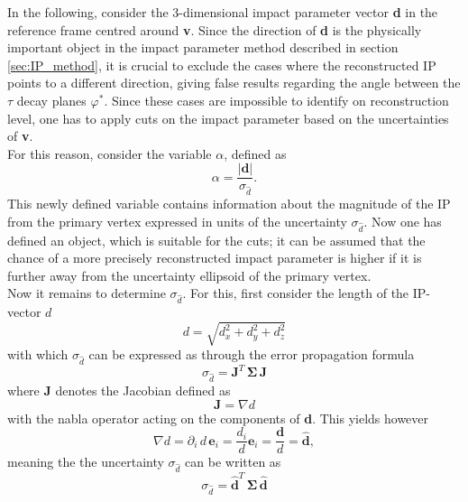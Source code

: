 In the following, consider the 3-dimensional impact parameter vector \textbf{d} in the reference frame centred around \textbf{v}. Since the direction of \textbf{d} is the physically important object in the impact parameter method described in section \ref{sec:IP_method}, it is crucial to exclude the cases where the reconstructed IP points to a different direction, giving false results regarding the angle between the $\tau$ decay planes $\varphi^*$. Since these cases are impossible to identify on reconstruction level, one has to apply cuts on the impact parameter based on the uncertainties of \textbf{v}.\\
For this reason, consider the variable $\alpha$, defined as
\begin{equation}
	\alpha = \frac{|\boldsymbol{d}|}{\sigma_{\hat{d}}}.
\end{equation}
This newly defined variable contains information about the magnitude of the IP from the primary vertex expressed in units of the uncertainty $\sigma_{\hat{d}}$. Now one has defined an object, which is suitable for the cuts; it can be assumed that the chance of a more precisely reconstructed impact parameter is higher if it is further away from the uncertainty ellipsoid of the primary vertex.\\
Now it remains to determine $\sigma_{\hat{d}}$. For this, first consider the length of the IP-vector $d$
\begin{equation}
	d = \sqrt{d_x^2+d_y^2+d_z^2}
\end{equation}
with which $\sigma_{\hat{d}}$ can be expressed as through the error propagation formula
\begin{equation}
	\sigma_{\hat{d}} = \mathbf{J}^T \, \boldsymbol{\Sigma} \, \mathbf{J}
\end{equation}
where \textbf{J} denotes the Jacobian defined as
\begin{equation}
	\mathbf{J} = \nabla d
\end{equation}
with the nabla operator acting on the components of \textbf{d}. This yields however
\begin{equation}
	\nabla d = \partial_i \, d \, \boldsymbol{e}_i = \frac{d_i}{d}\boldsymbol{e}_i = \frac{\boldsymbol{d}}{d} = \boldsymbol{\hat{d}},
\end{equation}
meaning the the uncertainty $\sigma_{\hat{d}}$ can be written as
\begin{equation}
	\sigma_{\hat{d}} = \boldsymbol{\hat{d}}^T \, \boldsymbol{\Sigma} \, \boldsymbol{\hat{d}}
\end{equation}
